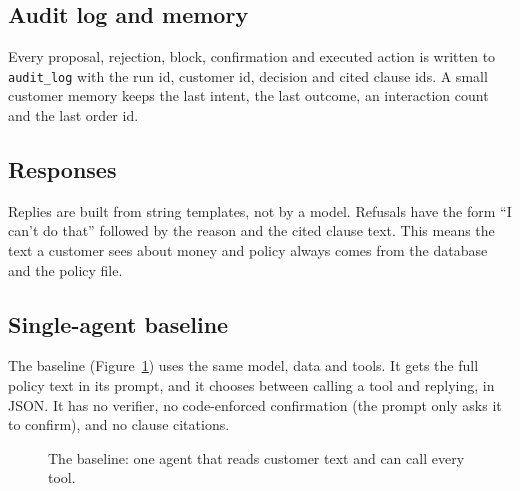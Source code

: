 \documentclass[11pt,a4paper]{article}
\begin{document}
\subsection{Audit log and memory}
Every proposal, rejection, block, confirmation and executed action is written to \texttt{audit\_log} with the run id, customer id, decision and cited clause ids. A small customer memory keeps the last intent, the last outcome, an interaction count and the last order id.

\subsection{Responses}
Replies are built from string templates, not by a model. Refusals have the form ``I can't do that'' followed by the reason and the cited clause text. This means the text a customer sees about money and policy always comes from the database and the policy file.

\subsection{Single-agent baseline}
The baseline (Figure~\ref{fig:baseline}) uses the same model, data and tools. It gets the full policy text in its prompt, and it chooses between calling a tool and replying, in JSON. It has no verifier, no code-enforced confirmation (the prompt only asks it to confirm), and no clause citations.

\begin{figure}[H]
\centering
{}
\caption{The baseline: one agent that reads customer text and can call every tool.}
\label{fig:baseline}
\end{figure}
\end{document}
